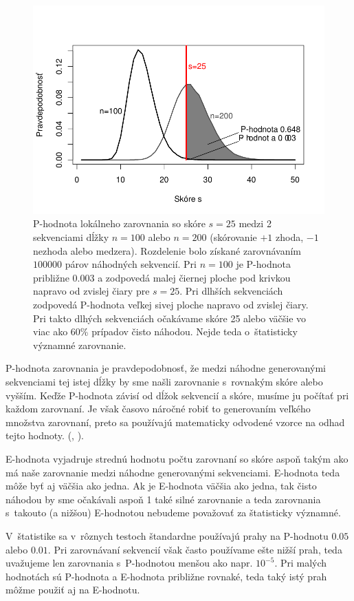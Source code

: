 \begin{figure}[htp]
    \centering
    \includegraphics[width=.9\textwidth]{images/p-value}
    \caption[P-hodnota lokálneho zarovnania]{P-hodnota lokálneho zarovnania so skóre $s = 25$ medzi 2 sekvenciami dĺžky $n = 100$ alebo $n = 200$ (skórovanie $+1$ zhoda, $-1$ nezhoda alebo medzera). Rozdelenie bolo získané zarovnávaním $100000$ párov náhodných sekvencií. Pri $n=100$ je P-hodnota približne 0.003 a zodpovedá malej čiernej ploche pod krivkou napravo od zvislej čiary pre $s=25$. Pri dlhších sekvenciách zodpovedá P-hodnota veľkej sivej ploche napravo od zvislej čiary. Pri takto dlhých sekvenciách očakávame skóre 25 alebo väčšie vo viac ako 60\% prípadov čisto náhodou. Nejde teda o~štatisticky významné zarovnanie.}
    \label{fig:p-value}
\end{figure}

P-hodnota zarovnania je pravdepodobnosť, že medzi náhodne generovanými sekvenciami tej istej dĺžky by sme našli zarovnanie s~rovnakým skóre alebo vyšším. Keďže P-hodnota závisí od dĺžok sekvencií a skóre, musíme ju počítať pri každom zarovnaní. Je však časovo náročné robiť to generovaním veľkého množstva zarovnaní, preto sa používajú matematicky odvodené vzorce na odhad tejto hodnoty. (\cite{Karlin}, \cite{Mitrophanov}).

E-hodnota vyjadruje strednú hodnotu počtu zarovnaní so skóre aspoň takým ako má naše zarovnanie medzi náhodne generovanými sekvenciami. E-hodnota teda môže byť aj väčšia ako jedna. Ak je E-hodnota väčšia ako jedna, tak čisto náhodou by sme očakávali aspoň 1 také silné zarovnanie a teda zarovnania s~takouto (a nižšou) E-hodnotou nebudeme považovať za štatisticky významné.

V~štatistike sa v~rôznych testoch štandardne používajú prahy na P-hodnotu $0.05$ alebo $0.01$.
Pri zarovnávaní sekvencií však často používame ešte nižší prah, teda uvažujeme len zarovnania s~P-hodnotou menšou ako napr. $10^{-5}$. Pri malých hodnotách sú P-hodnota a E-hodnota približne rovnaké, teda taký istý prah môžme použiť aj na E-hodnotu.
